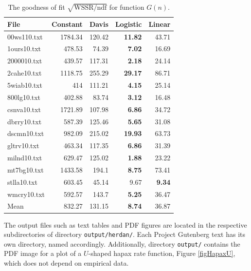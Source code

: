 \documentclass[a4paper,12pt]{article}
\newcommand{\toprule}{\hline}
\newcommand{\midrule}{\hline}
\newcommand{\botrule}{\hline}
\begin{document}
\begin{table}[p]
  \caption{The goodness of fit $\sqrt{\text{WSSR/ndf}}$ for
    function $G(n)$.\label{tabWSSRs}}
  \centering
  \medskip
  \begin{tabular}{|l|r|r|r|r|}
    \toprule
File    & Constant      & Davis & Logistic      & Linear\\
\midrule
00ws110.txt     & 1784.34       & 120.42        & \textbf{11.82}        & 43.71\\
1ours10.txt     & 478.53        & 74.39 & \textbf{7.02} & 16.69\\
2000010.txt     & 439.57        & 117.31        & \textbf{2.18} & 24.14\\
2cahe10.txt     & 1118.75       & 255.29        & \textbf{29.17}        & 86.71\\
5wiab10.txt     & 414   & 111.21        & \textbf{4.15} & 25.14\\
800lg10.txt     & 402.88        & 83.74 & \textbf{3.12} & 16.48\\
csnva10.txt     & 1721.89       & 107.98        & \textbf{6.86} & 34.72\\
dbrry10.txt     & 587.39        & 125.46        & \textbf{5.65} & 31.08\\
dscmn10.txt     & 982.09        & 215.02        & \textbf{19.93}        & 63.73\\
gltrv10.txt     & 463.34        & 117.35        & \textbf{6.86} & 31.39\\
milnd10.txt     & 629.47        & 125.02        & \textbf{1.88} & 23.22\\
mt7bg10.txt     & 1433.58       & 194.1 & \textbf{8.75} & 73.41\\
stlla10.txt     & 603.45        & 45.14 & 9.67  & \textbf{9.34}\\
wmcry10.txt     & 592.57        & 143.7 & \textbf{5.25} & 36.47\\
\midrule
Mean    & 832.27        & 131.15        & \textbf{8.74} & 36.87\\
\botrule
  \end{tabular}
\end{table}

The output files such as text tables and PDF figures are located in
the respective subdirectories of directory \verb}output/herdan/}. Each
Project Gutenberg text has its own directory, named
accordingly. Additionally, directory \verb}output/} contains the PDF
image for a plot of a $U$-shaped hapax rate function, Figure
\ref{figHapaxU}, which does not depend on empirical data.
\end{document}
